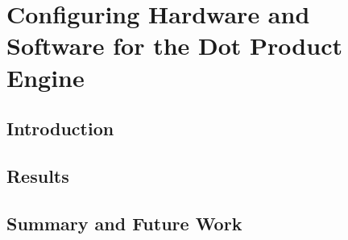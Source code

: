 \section{Configuring Hardware and Software for the Dot Product Engine}
\label{sec:configDPE}

\subsection{Introduction}
\label{subsec:DPEintro}

\subsection{Results}
\label{subsec:DPEres}

\subsection{Summary and Future Work}
\label{subsec:DPEconcl}
